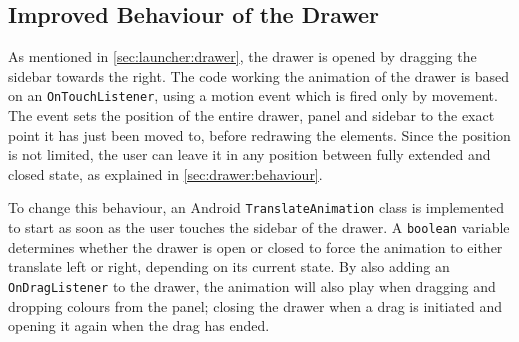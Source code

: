 \subsection{Improved Behaviour of the Drawer}\label{sec:developments:drawerimprovements}
As mentioned in \cref{sec:launcher:drawer}, the drawer is opened by dragging the sidebar towards the right.
The code working the animation of the drawer is based on an \lstinline|OnTouchListener|, using a motion event which is fired only by movement.
The event sets the position of the entire drawer, panel and sidebar to the exact point it has just been moved to, before redrawing the elements.
Since the position is not limited, the user can leave it in any position between fully extended and closed state, as explained in \cref{sec:drawer:behaviour}.

To change this behaviour, an Android \lstinline{TranslateAnimation} class is implemented to start as soon as the user touches the sidebar of the drawer.
A \lstinline{boolean} variable determines whether the drawer is open or closed to force the animation to either translate left or right, depending on its current state.
By also adding an \lstinline{OnDragListener} to the drawer, the animation will also play when dragging and dropping colours from the panel; closing the drawer when a drag is initiated and opening it again when the drag has ended.